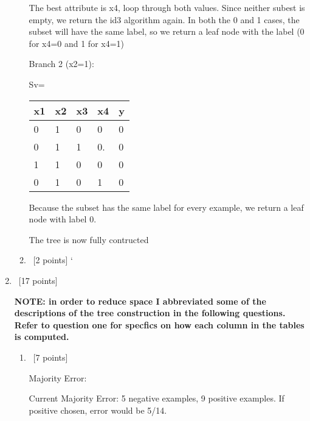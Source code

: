 \documentclass[12pt, fullpage,letterpaper]{article}
\begin{document}
\begin{enumerate}
\begin{enumerate}
The best attribute is x4,  loop through both values. Since neither subest is empty, we return the id3 algorithm again. In both the 0 and 1 cases, the subset will have the same label, so we return a leaf node with the label (0 for x4=0 and 1 for x4=1)

Branch 2 (x2=1):

Sv=\begin{tabular}{|l|l|l|l|l|}
	\hline
	x1 & x2 & x3 & x4 & y \\ \hline
	0  & 1  & 0  & 0  & 0 \\ \hline
	0  & 1  & 1  & 0. & 0 \\ \hline
	1  & 1  & 0  & 0  & 0 \\ \hline
	0  & 1  & 0  & 1  & 0 \\ \hline
	\end{tabular}

Because the subset has the same label for every example, we return a leaf node with label 0.

The tree is now fully contructed

\item~[2 points] 
`\end{enumerate}
\item~[17 points] 

\textbf{NOTE: in order to reduce space I abbreviated some of the descriptions of the tree construction in the following questions. Refer to question one for specfics on how each column in the tables is computed.}
\begin{enumerate}
	\item~[7 points]
	
Majority Error:

Current Majority Error:  5 negative examples, 9 positive examples. If positive chosen, error would be 5/14.


\end{enumerate}
\end{enumerate}
\end{document}
